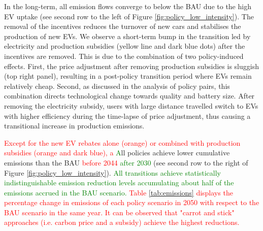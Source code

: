 \documentclass[12pt]{article}
\begin{document}
	In the long-term, all emission flows converge to below the BAU due to the high EV uptake (see second row to the left of Figure \ref{fig:policy_low_intensity}). The removal of the incentives reduces the turnover of new cars and stabilises the production of new EVs. We observe a short-term bump in the transition led by electricity and production subsidies (yellow line and dark blue dots) after the incentives are removed. This is due to the combination of two policy-induced effects. First, the price adjustment after removing production subsidies is sluggish (top right panel), resulting in a post-policy transition period where EVs remain relatively cheap. Second, as discussed in the analysis of policy pairs, this combination directs technological change towards quality and battery size. After removing the electricity subsidy, users with large distance travelled switch to EVs with higher efficiency during the time-lapse of price adjustment, thus causing a transitional increase in production emissions.  
    
    \textcolor{red}{Except for the new EV rebates alone (orange) or combined with production subsidies (orange and dark blue), a} \textcolor{green}{A}ll policies achieve lower cumulative emissions than the BAU \textcolor{red}{before 2044} \textcolor{green}{after 2030} (see second row to the right of Figure \ref{fig:policy_low_intensity}). \textcolor{green}{All transitions achieve statistically indistinguishable emission reduction levels accumulating about half of the emissions accrued in the BAU scenario.} \textcolor{red}{Table \ref{tab:emissions} displays the percentage change in emissions of each policy scenario in 2050 with respect to the BAU scenario in the same year. It can be observed that "carrot and stick" approaches (i.e. carbon price and a subsidy) achieve the highest reductions.}    
\end{document}
